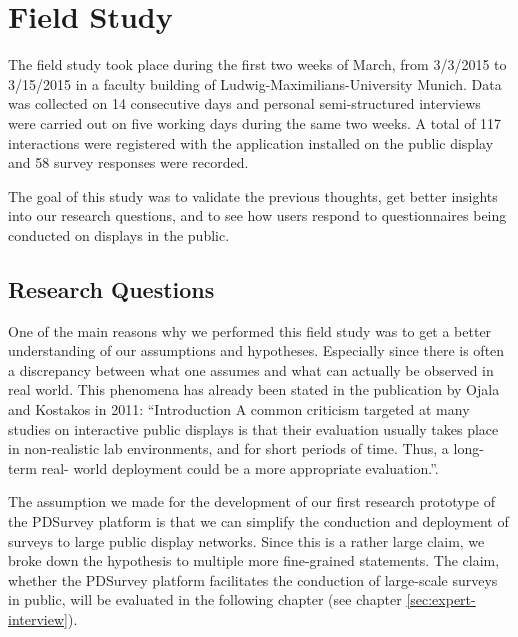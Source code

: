 \section{Field Study}
\label{sec:field-study}


	The field study took place during the first two weeks of March, from 3/3/2015 to 3/15/2015 in a faculty building of Ludwig-Maximilians-University Munich. Data was collected on 14 consecutive days and personal semi-structured interviews were carried out on five working days during the same two weeks. A total of 117 interactions were registered with the application installed on the public display and 58 survey responses were recorded.

	The goal of this study was to validate the previous thoughts, get better insights into our research questions, and to see how users respond to questionnaires being conducted on displays in the public.




\subsection{Research Questions}


	One of the main reasons why we performed this field study was to get a better understanding of our assumptions and hypotheses. Especially since there is often a discrepancy between what one assumes and what can actually be observed in real world. This phenomena has already been stated in the publication by Ojala and Kostakos in 2011: ``Introduction A common criticism targeted at many studies on interactive public displays is that their evaluation usually takes place in non-realistic lab environments, and for short periods of time. Thus, a long-term real- world deployment could be a more appropriate evaluation.''\cite{Ojala2011}.



	The assumption we made for the development of our first research prototype of the PDSurvey platform is that we can simplify the conduction and deployment of surveys to large public display networks. Since this is a rather large claim, we broke down the hypothesis to multiple more fine-grained statements. The claim, whether the PDSurvey platform facilitates the conduction of large-scale surveys in public, will be evaluated in the following chapter (see chapter \ref{sec:expert-interview}). 

